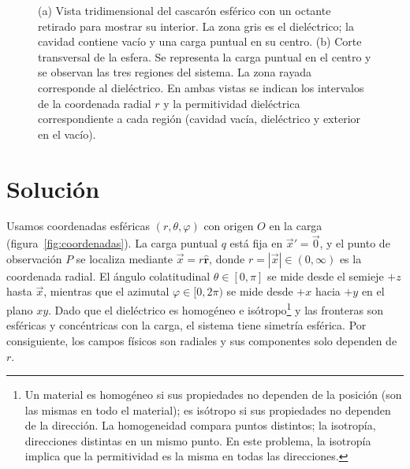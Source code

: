\documentclass[11pt]{article}
\newcommand{\er}{\hat{\mathbf r}}
\begin{document}
\begin{figure}[H]
\caption{(a) Vista tridimensional del cascarón esférico con un octante
retirado para mostrar su interior. La zona gris es el dieléctrico;
la cavidad contiene vacío y una carga puntual en su centro.
(b) Corte transversal de la esfera. Se representa la carga puntual
en el centro y se observan las tres regiones del sistema.
La zona rayada corresponde al dieléctrico. En ambas vistas se indican
los intervalos de la coordenada radial $r$ y la permitividad
dieléctrica correspondiente a cada región (cavidad vacía, dieléctrico
y exterior en el vacío).}
\label{fig:cascaron3d}
\label{fig:sistema}
\end{figure}

\newpage

\section*{Solución}
Usamos coordenadas esféricas $(r,\theta,\varphi)$ con origen $O$ en la
carga (figura~\ref{fig:coordenadas}). La carga puntual $q$ está fija en
$\vec x'=\vec0$, y el punto de observación $P$ se localiza mediante
$\vec x=r\er$, donde $r=|\vec x|\in(0,\infty)$ es la coordenada radial.
El ángulo colatitudinal $\theta\in[0,\pi]$ se mide desde el semieje
$+z$ hasta $\vec x$, mientras que el azimutal $\varphi\in[0,2\pi)$
se mide desde $+x$ hacia $+y$ en el plano $xy$. Dado que el dieléctrico
es homogéneo e isótropo\footnote{Un material es homogéneo si sus propiedades no dependen de la posición (son las mismas en todo el material); es isótropo si sus propiedades no dependen de la dirección. La homogeneidad compara puntos distintos; la isotropía, direcciones distintas en un mismo punto. En este problema, la isotropía implica que la permitividad es la misma en todas las direcciones.} y las fronteras son esféricas y
concéntricas con la carga, el sistema tiene simetría esférica.
Por consiguiente, los campos físicos son radiales y sus componentes
solo dependen de $r$.
\end{document}
